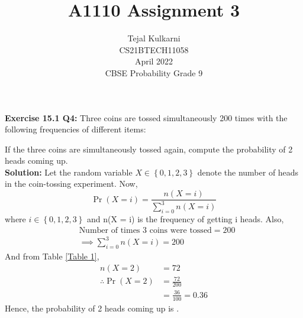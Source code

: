 \documentclass[journal,12pt,two column]{IEEEtran}
\title{A1110 Assignment 3 }
\author{Tejal Kulkarni \\ CS21BTECH11058 \\\vspace*{20pt} April 2022 \\ CBSE Probability Grade 9 }
\begin{document}
\newcommand{\solution}{\noindent \textbf{Solution: }}
\providecommand{\pr}[1]{\ensuremath{\Pr\left(#1\right)}}
\providecommand{\qfunc}[1]{\ensuremath{Q\left(#1\right)}}
\providecommand{\sbrak}[1]{\ensuremath{{}\left[#1\right]}}
\providecommand{\lsbrak}[1]{\ensuremath{{}\left[#1\right.}}
\providecommand{\rsbrak}[1]{\ensuremath{{}\left.#1\right]}}
\providecommand{\brak}[1]{\ensuremath{\left(#1\right)}}
\providecommand{\lbrak}[1]{\ensuremath{\left(#1\right.}}
\providecommand{\rbrak}[1]{\ensuremath{\left.#1\right)}}
\providecommand{\cbrak}[1]{\ensuremath{\left\{#1\right\}}}
\providecommand{\lcbrak}[1]{\ensuremath{\left\{#1\right.}}
\providecommand{\rcbrak}[1]{\ensuremath{\left.#1\right\}}}
\renewcommand{\thetable}{\arabic{table}} 

\maketitle

\textbf{Exercise 15.1 Q4:} Three coins are tossed simultaneously 200 times with the following frequencies of different items:
\begin{table}[ht!]
    \centering
    
    \caption{}
    \label{Table 1}
\end{table}

If the three coins are simultaneously tossed again, compute the probability of 2 heads coming up.\\ 
\solution
Let the random variable $X \in \cbrak{0,1,2,3}$ denote the number of heads in the coin-tossing experiment. Now, 
\begin{equation}
   \pr{X = i} = \dfrac{n(X = i)}{\sum_{i=0}^{3} n(X = i) }
\end{equation}
where $i \in \cbrak{0,1,2,3}$ and n(X = i) is the frequency of getting i heads. Also,
\begin{align}
&\text{Number of times 3 coins were tossed} = 200\\ 
&\implies  \sum_{i=0}^{3} n(X = i) = 200
\end{align}
And from Table \ref{Table 1}, 
\begin{align}
                n(X = 2) &= 72 \\
\therefore    \pr{X = 2} &= \frac{72}{200} \\
                         &= \frac{36}{100} = 0.36 
\end{align}
Hence, the probability of 2 heads coming up is .
\end{document}
